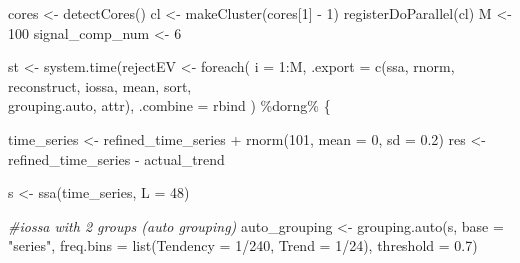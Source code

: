 \documentclass[specialist,
               substylefile = spbu_report.rtx,
               subf,href,colorlinks=true, 12pt]{disser}
\theoremstyle{definition}
\newenvironment{Shaded}{\begin{snugshade}}{\end{snugshade}}
\newcommand{\AttributeTok}[1]{\textcolor[rgb]{0.77,0.63,0.00}{#1}}
\newcommand{\CommentTok}[1]{\textcolor[rgb]{0.56,0.35,0.01}{\textit{#1}}}
\newcommand{\DecValTok}[1]{\textcolor[rgb]{0.00,0.00,0.81}{#1}}
\newcommand{\FloatTok}[1]{\textcolor[rgb]{0.00,0.00,0.81}{#1}}
\newcommand{\FunctionTok}[1]{\textcolor[rgb]{0.00,0.00,0.00}{#1}}
\newcommand{\NormalTok}[1]{#1}
\newcommand{\OtherTok}[1]{\textcolor[rgb]{0.56,0.35,0.01}{#1}}
\newcommand{\SpecialCharTok}[1]{\textcolor[rgb]{0.00,0.00,0.00}{#1}}
\newcommand{\StringTok}[1]{\textcolor[rgb]{0.31,0.60,0.02}{#1}}
\begin{document}
\begin{Shaded}
\begin{Highlighting}[]
\NormalTok{  cores }\OtherTok{\textless{}{-}} \FunctionTok{detectCores}\NormalTok{()}
\NormalTok{  cl }\OtherTok{\textless{}{-}} \FunctionTok{makeCluster}\NormalTok{(cores[}\DecValTok{1}\NormalTok{] }\SpecialCharTok{{-}} \DecValTok{1}\NormalTok{)}
  \FunctionTok{registerDoParallel}\NormalTok{(cl)}
\NormalTok{  M }\OtherTok{\textless{}{-}} \DecValTok{100}
\NormalTok{  signal\_comp\_num }\OtherTok{\textless{}{-}} \DecValTok{6}
  
\NormalTok{  st }\OtherTok{\textless{}{-}} \FunctionTok{system.time}\NormalTok{(rejectEV }\OtherTok{\textless{}{-}} \FunctionTok{foreach}\NormalTok{(}
    \AttributeTok{i =} \DecValTok{1}\SpecialCharTok{:}\NormalTok{M,}
    \AttributeTok{.export =} \FunctionTok{c}\NormalTok{(}\StringTok{\textquotesingle{}ssa\textquotesingle{}}\NormalTok{, }\StringTok{\textquotesingle{}rnorm\textquotesingle{}}\NormalTok{, }\StringTok{\textquotesingle{}reconstruct\textquotesingle{}}\NormalTok{, }\StringTok{\textquotesingle{}iossa\textquotesingle{}}\NormalTok{, }\StringTok{\textquotesingle{}mean\textquotesingle{}}\NormalTok{, }\StringTok{\textquotesingle{}sort\textquotesingle{}}\NormalTok{, }
    \\ \StringTok{\textquotesingle{}grouping.auto\textquotesingle{}}\NormalTok{, }\StringTok{\textquotesingle{}attr\textquotesingle{}}\NormalTok{),}
    \AttributeTok{.combine =}\NormalTok{ rbind}
\NormalTok{  ) }\SpecialCharTok{\%dorng\%}\NormalTok{ \{}
    
\NormalTok{    time\_series }\OtherTok{\textless{}{-}}\NormalTok{ refined\_time\_series }\SpecialCharTok{+} \FunctionTok{rnorm}\NormalTok{(}\DecValTok{101}\NormalTok{, }\AttributeTok{mean =} \DecValTok{0}\NormalTok{, }\AttributeTok{sd =} \FloatTok{0.2}\NormalTok{)}
\NormalTok{    res }\OtherTok{\textless{}{-}}\NormalTok{ refined\_time\_series }\SpecialCharTok{{-}}\NormalTok{ actual\_trend}
    
\NormalTok{    s }\OtherTok{\textless{}{-}} \FunctionTok{ssa}\NormalTok{(time\_series, }\AttributeTok{L =} \DecValTok{48}\NormalTok{)}
    
    \CommentTok{\#iossa with 2 groups (auto grouping)}
\NormalTok{    auto\_grouping }\OtherTok{\textless{}{-}} \FunctionTok{grouping.auto}\NormalTok{(s, }\AttributeTok{base =} \StringTok{"series"}\NormalTok{, }
                    \AttributeTok{freq.bins =} \FunctionTok{list}\NormalTok{(}\AttributeTok{Tendency =} \DecValTok{1}\SpecialCharTok{/}\DecValTok{240}\NormalTok{, }\AttributeTok{Trend =} \DecValTok{1}\SpecialCharTok{/}\DecValTok{24}\NormalTok{), }
                    \AttributeTok{threshold =} \FloatTok{0.7}\NormalTok{)}
    

\end{Highlighting}
\end{Shaded}
\end{document}
